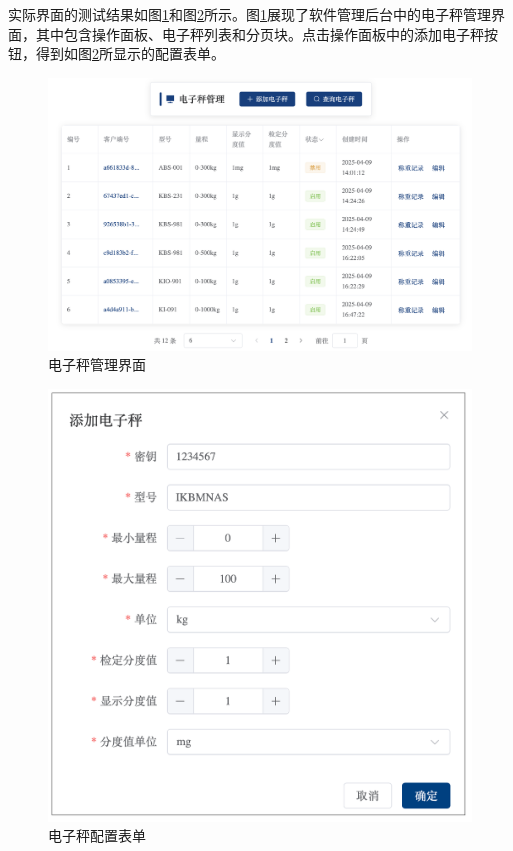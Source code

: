 实际界面的测试结果如图\ref{fig:web-scale}和图\ref{fig:form-new-scale}所示。图\ref{fig:web-scale}展现了软件管理后台中的电子秤管理界面，其中包含操作面板、电子秤列表和分页块。点击操作面板中的添加电子秤按钮，得到如图\ref{fig:form-new-scale}所显示的配置表单。

\begin{figure}
    \centering
    \includegraphics[width=\linewidth]{../result/web-scale.png}
    \caption{电子秤管理界面}
    \label{fig:web-scale}
\end{figure}

\begin{figure}
    \centering
    \includegraphics[width=0.8\linewidth]{../result/form-new-scale.png}
    \caption{电子秤配置表单}
    \label{fig:form-new-scale}
\end{figure}

